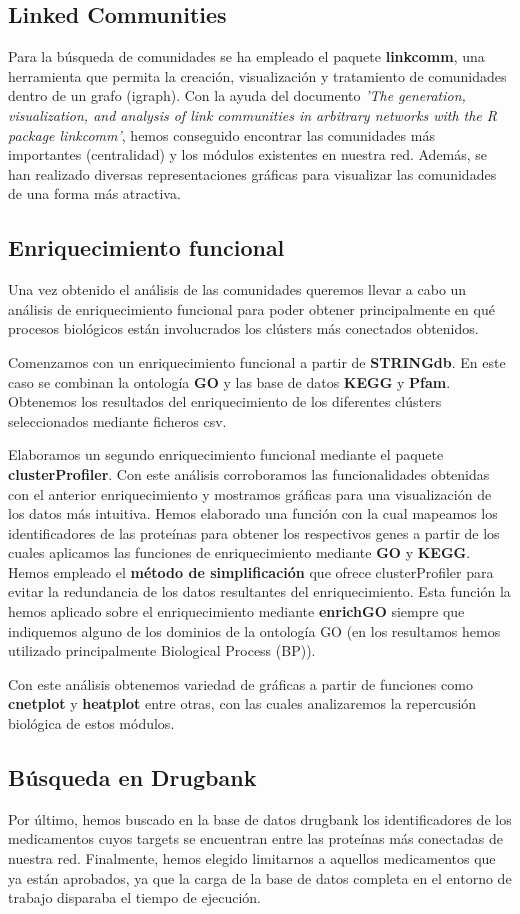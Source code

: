\subsection{Linked Communities}
Para la búsqueda de comunidades se ha empleado el paquete \textbf{linkcomm}, una herramienta que permita la creación, visualización y tratamiento de comunidades dentro de un grafo (igraph). Con la ayuda del documento \textit{'The generation, visualization, and analysis of link communities in arbitrary networks with the R package linkcomm'}, hemos conseguido encontrar las comunidades más importantes (centralidad) y los módulos existentes en nuestra red. Además, se han realizado diversas representaciones gráficas para visualizar las comunidades de una forma más atractiva. 

\subsection{Enriquecimiento funcional}
Una vez obtenido el análisis de las comunidades queremos llevar a cabo un análisis de enriquecimiento funcional para poder obtener principalmente en qué procesos biológicos están involucrados los clústers más conectados obtenidos. 

Comenzamos con un enriquecimiento funcional a partir de \textbf{STRINGdb}. En este caso se combinan la ontología \textbf{GO} y las base de datos \textbf{KEGG} y \textbf{Pfam}. Obtenemos los resultados del enriquecimiento de los diferentes clústers seleccionados mediante ficheros csv. 

Elaboramos un segundo enriquecimiento funcional mediante el paquete \textbf{clusterProfiler}. Con este análisis corroboramos las funcionalidades obtenidas con el anterior enriquecimiento y mostramos gráficas para una visualización de los datos más intuitiva. Hemos elaborado una función con la cual mapeamos los identificadores de las proteínas para obtener los respectivos genes a partir de los cuales aplicamos las funciones de enriquecimiento mediante \textbf{GO} y \textbf{KEGG}. Hemos empleado el \textbf{método de simplificación} que ofrece clusterProfiler para evitar la redundancia de los datos resultantes del enriquecimiento. Esta función la hemos aplicado sobre el enriquecimiento mediante \textbf{enrichGO} siempre que indiquemos alguno de los dominios de la ontología GO (en los resultamos hemos utilizado principalmente Biological Process (BP)). 

Con este análisis obtenemos variedad de gráficas a partir de funciones como \textbf{cnetplot} y \textbf{heatplot} entre otras, con las cuales analizaremos la repercusión biológica de estos módulos.

\subsection{Búsqueda en Drugbank}
Por último, hemos buscado en la base de datos drugbank los identificadores de los medicamentos cuyos targets se encuentran entre las proteínas más conectadas de nuestra red.
Finalmente, hemos elegido limitarnos a aquellos medicamentos que ya están aprobados, ya que la carga de la base de datos completa en el entorno de trabajo disparaba el tiempo de ejecución.
